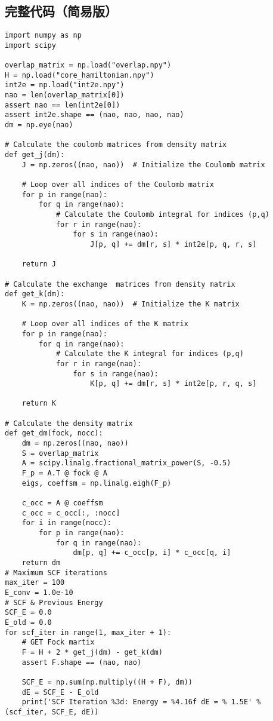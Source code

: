 \documentclass[12pt, a4paper, oneside]{ctexart}
\begin{document}
\begin{appendices}
    \renewcommand{\thesection}{\Alph{section}}
    \section{完整代码（简易版）}
\begin{lstlisting}[style = Python]
import numpy as np
import scipy

overlap_matrix = np.load("overlap.npy")
H = np.load("core_hamiltonian.npy")
int2e = np.load("int2e.npy")
nao = len(overlap_matrix[0])
assert nao == len(int2e[0])
assert int2e.shape == (nao, nao, nao, nao)
dm = np.eye(nao)

# Calculate the coulomb matrices from density matrix
def get_j(dm):
    J = np.zeros((nao, nao))  # Initialize the Coulomb matrix

    # Loop over all indices of the Coulomb matrix
    for p in range(nao):
        for q in range(nao):
            # Calculate the Coulomb integral for indices (p,q)
            for r in range(nao):
                for s in range(nao):
                    J[p, q] += dm[r, s] * int2e[p, q, r, s]

    return J

# Calculate the exchange  matrices from density matrix
def get_k(dm):
    K = np.zeros((nao, nao))  # Initialize the K matrix

    # Loop over all indices of the K matrix
    for p in range(nao):
        for q in range(nao):
            # Calculate the K integral for indices (p,q)
            for r in range(nao):
                for s in range(nao):
                    K[p, q] += dm[r, s] * int2e[p, r, q, s]

    return K

# Calculate the density matrix
def get_dm(fock, nocc):
    dm = np.zeros((nao, nao))
    S = overlap_matrix
    A = scipy.linalg.fractional_matrix_power(S, -0.5)
    F_p = A.T @ fock @ A
    eigs, coeffsm = np.linalg.eigh(F_p)

    c_occ = A @ coeffsm
    c_occ = c_occ[:, :nocc]
    for i in range(nocc):
        for p in range(nao):
            for q in range(nao):
                dm[p, q] += c_occ[p, i] * c_occ[q, i]
    return dm
# Maximum SCF iterations
max_iter = 100
E_conv = 1.0e-10
# SCF & Previous Energy
SCF_E = 0.0
E_old = 0.0
for scf_iter in range(1, max_iter + 1):
    # GET Fock martix
    F = H + 2 * get_j(dm) - get_k(dm)
    assert F.shape == (nao, nao)

    SCF_E = np.sum(np.multiply((H + F), dm))
    dE = SCF_E - E_old
    print('SCF Iteration %3d: Energy = %4.16f dE = % 1.5E' % (scf_iter, SCF_E, dE))


\end{lstlisting}
\end{appendices}
\end{document}
